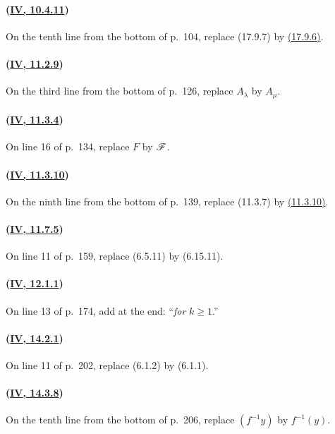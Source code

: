 \paragraph{({\texorpdfstring{\protect\hyperref[IV.10.4.11]{\textbf{IV}, 10.4.11}}{IV, 10.4.11}})}
On the tenth line from the bottom of p.~104, replace (17.9.7) by
{\hyperref[IV.17.9]{(17.9.6)}}.

\paragraph{({\texorpdfstring{\protect\hyperref[IV.11.2.9]{\textbf{IV}, 11.2.9}}{IV, 11.2.9}})}
On the third line from the bottom of p.~126, replace $A_\lambda$ by
$A_\mu$.

\paragraph{({\texorpdfstring{\protect\hyperref[IV.11.3.4]{\textbf{IV}, 11.3.4}}{IV, 11.3.4}})}
On line 16 of p.~134, replace $F$ by $\mathscr{F}$.

\paragraph{({\texorpdfstring{\protect\hyperref[IV.11.3.10]{\textbf{IV}, 11.3.10}}{IV, 11.3.10}})}
On the ninth line from the bottom of p.~139, replace (11.3.7) by
{\hyperref[IV.11.3.10]{(11.3.10)}}.

\paragraph{({\texorpdfstring{\protect\hyperref[IV.11.7.5]{\textbf{IV}, 11.7.5}}{IV, 11.7.5}})}
On line 11 of p.~159, replace (6.5.11) by (6.15.11).

\paragraph{({\texorpdfstring{\protect\hyperref[IV.12.1.1]{\textbf{IV}, 12.1.1}}{IV, 12.1.1}})}
On line 13 of p.~174, add at the end: ``\emph{for} $k\geq 1$.''

\paragraph{({\texorpdfstring{\protect\hyperref[IV.14.2.1]{\textbf{IV}, 14.2.1}}{IV, 14.2.1}})}
On line 11 of p.~202, replace (6.1.2) by (6.1.1).

\paragraph{({\texorpdfstring{\protect\hyperref[IV.14.3.8]{\textbf{IV}, 14.3.8}}{IV, 14.3.8}})}
On the tenth line from the bottom of p.~206, replace $(f^{-1}y)$ by
$f^{-1}(y)$.

